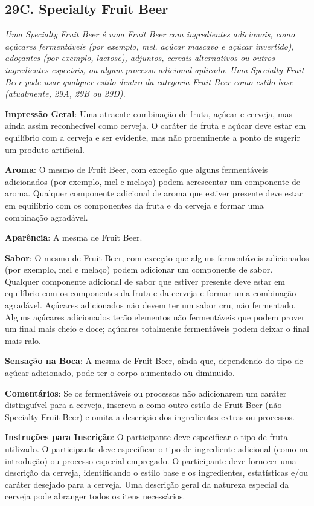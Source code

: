 \subsection*{29C. Specialty Fruit Beer}
\textit{Uma Specialty Fruit Beer é uma Fruit Beer com ingredientes adicionais, como açúcares fermentáveis (por exemplo, mel, açúcar mascavo e açúcar invertido), adoçantes (por exemplo, lactose), adjuntos, cereais alternativos ou outros ingredientes especiais, ou algum processo adicional aplicado. Uma Specialty Fruit Beer pode usar qualquer estilo dentro da categoria Fruit Beer como estilo base (atualmente, 29A, 29B ou 29D).}

\textbf{Impressão Geral}: Uma atraente combinação de fruta, açúcar e cerveja, mas ainda assim reconhecível como cerveja. O caráter de fruta e açúcar deve estar em equilíbrio com a cerveja e ser evidente, mas não proeminente a ponto de sugerir um produto artificial.

\textbf{Aroma}: O mesmo de Fruit Beer, com exceção que alguns fermentáveis adicionados (por exemplo, mel e melaço) podem acrescentar um componente de aroma. Qualquer componente adicional de aroma que estiver presente deve estar em equilíbrio com os componentes da fruta e da cerveja e formar uma combinação agradável.

\textbf{Aparência}: A mesma de Fruit Beer.

\textbf{Sabor}: O mesmo de Fruit Beer, com exceção que alguns fermentáveis adicionados (por exemplo, mel e melaço) podem adicionar um componente de sabor. Qualquer componente adicional de sabor que estiver presente deve estar em equilíbrio com os componentes da fruta e da cerveja e formar uma combinação agradável. Açúcares adicionados não devem ter um sabor cru, não fermentado. Alguns açúcares adicionados terão elementos não fermentáveis que podem prover um final mais cheio e doce; açúcares totalmente fermentáveis podem deixar o final mais ralo.

\textbf{Sensação na Boca}: A mesma de Fruit Beer, ainda que, dependendo do tipo de açúcar adicionado, pode ter o corpo aumentado ou diminuído.

\textbf{Comentários}: Se os fermentáveis ou processos não adicionarem um caráter distinguível para a cerveja, inscreva-a como outro estilo de Fruit Beer (não Specialty Fruit Beer) e omita a descrição dos ingredientes extras ou processos.

\textbf{Instruções para Inscrição}: O participante deve especificar o tipo de fruta utilizado. O participante deve especificar o tipo de ingrediente adicional (como na introdução) ou processo especial empregado. O participante deve fornecer uma descrição da cerveja, identificando o estilo base e os ingredientes, estatísticas e/ou caráter desejado para a cerveja. Uma descrição geral da natureza especial da cerveja pode abranger todos os itens necessários.

